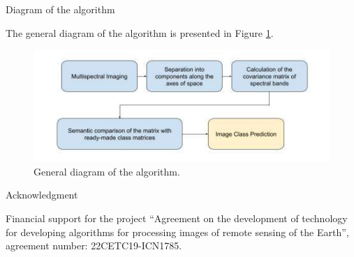 \documentclass{article}
\begin{document}
\begin{multicols*}{2}
\begin{center}
    Diagram of the algorithm 
\end{center} 
\vspace{-5pt}
\par The general diagram of the algorithm is presented in Figure 
\ref{figure7}. 

\begin{figure}[H]
    \centering
    \includegraphics[width=\linewidth]{img7}
    \caption{\small \centering General diagram of the algorithm. \label{figure7}}
    
\end{figure} 

\begin{center}
    Acknowledgment \par
\end{center} 

Financial support for the project “Agreement on the
development of technology for developing algorithms
for processing images of remote sensing of the Earth”,
agreement number: 22CETC19-ICN1785. \par

\newcolumn


\end{multicols*}
\end{document}
